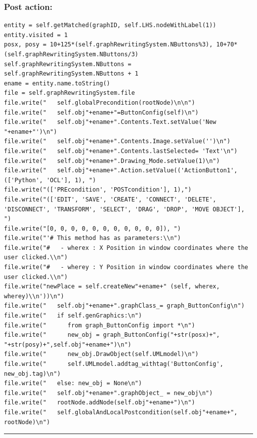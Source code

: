 \documentclass{article}
\begin{document}
\subsubsection*{Post action: }
\begin{small}\begin{verbatim}
entity = self.getMatched(graphID, self.LHS.nodeWithLabel(1))
entity.visited = 1
posx, posy = 10+125*(self.graphRewritingSystem.NButtons%3), 10+70*(self.graphRewritingSystem.NButtons/3)
self.graphRewritingSystem.NButtons = self.graphRewritingSystem.NButtons + 1
ename = entity.name.toString()
file = self.graphRewritingSystem.file
file.write("   self.globalPrecondition(rootNode)\n\n")
file.write("   self.obj"+ename+"=ButtonConfig(self)\n")
file.write("   self.obj"+ename+".Contents.Text.setValue('New "+ename+"')\n")
file.write("   self.obj"+ename+".Contents.Image.setValue('')\n")
file.write("   self.obj"+ename+".Contents.lastSelected= 'Text'\n")
file.write("   self.obj"+ename+".Drawing_Mode.setValue(1)\n")
file.write("   self.obj"+ename+".Action.setValue(('ActionButton1', (['Python', 'OCL'], 1), ")
file.write("(['PREcondition', 'POSTcondition'], 1),")
file.write("(['EDIT', 'SAVE', 'CREATE', 'CONNECT', 'DELETE', 'DISCONNECT', 'TRANSFORM', 'SELECT', 'DRAG', 'DROP', 'MOVE OBJECT'], ")
file.write("[0, 0, 0, 0, 0, 0, 0, 0, 0, 0, 0]), ")
file.write("'# This method has as parameters:\\n")
file.write("#   - wherex : X Position in window coordinates where the user clicked.\\n")
file.write("#   - wherey : Y Position in window coordinates where the user clicked.\\n")
file.write("newPlace = self.createNew"+ename+" (self, wherex, wherey)\\n'))\n")
file.write("   self.obj"+ename+".graphClass_= graph_ButtonConfig\n")
file.write("   if self.genGraphics:\n")
file.write("      from graph_ButtonConfig import *\n")
file.write("      new_obj = graph_ButtonConfig("+str(posx)+", "+str(posy)+",self.obj"+ename+")\n")
file.write("      new_obj.DrawObject(self.UMLmodel)\n")
file.write("      self.UMLmodel.addtag_withtag('ButtonConfig', new_obj.tag)\n")
file.write("   else: new_obj = None\n")
file.write("   self.obj"+ename+".graphObject_ = new_obj\n")
file.write("   rootNode.addNode(self.obj"+ename+")\n")
file.write("   self.globalAndLocalPostcondition(self.obj"+ename+", rootNode)\n")
\end{verbatim}\end{small}

\hrule \vspace{6pt}
\end{document}
